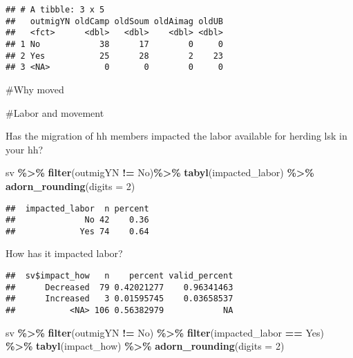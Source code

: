 \documentclass[
]{article}
\newenvironment{Shaded}{\begin{snugshade}}{\end{snugshade}}
\newcommand{\AttributeTok}[1]{\textcolor[rgb]{0.13,0.29,0.53}{#1}}
\newcommand{\DecValTok}[1]{\textcolor[rgb]{0.00,0.00,0.81}{#1}}
\newcommand{\FunctionTok}[1]{\textcolor[rgb]{0.13,0.29,0.53}{\textbf{#1}}}
\newcommand{\NormalTok}[1]{#1}
\newcommand{\SpecialCharTok}[1]{\textcolor[rgb]{0.81,0.36,0.00}{\textbf{#1}}}
\newcommand{\StringTok}[1]{\textcolor[rgb]{0.31,0.60,0.02}{#1}}
\begin{document}
\begin{verbatim}
## # A tibble: 3 x 5
##   outmigYN oldCamp oldSoum oldAimag oldUB
##   <fct>      <dbl>   <dbl>    <dbl> <dbl>
## 1 No            38      17        0     0
## 2 Yes           25      28        2    23
## 3 <NA>           0       0        0     0
\end{verbatim}

\#Why moved

\#Labor and movement

Has the migration of hh members impacted the labor available for herding
lsk in your hh?

\begin{Shaded}
\begin{Highlighting}[]
\NormalTok{sv }\SpecialCharTok{\%\textgreater{}\%} \FunctionTok{filter}\NormalTok{(outmigYN }\SpecialCharTok{!=} \StringTok{\textquotesingle{}No\textquotesingle{}}\NormalTok{)}\SpecialCharTok{\%\textgreater{}\%}
  \FunctionTok{tabyl}\NormalTok{(impacted\_labor) }\SpecialCharTok{\%\textgreater{}\%}
  \FunctionTok{adorn\_rounding}\NormalTok{(}\AttributeTok{digits =} \DecValTok{2}\NormalTok{) }
\end{Highlighting}
\end{Shaded}

\begin{verbatim}
##  impacted_labor  n percent
##              No 42    0.36
##             Yes 74    0.64
\end{verbatim}

How has it impacted labor?

\begin{Shaded}
\end{Shaded}

\begin{verbatim}
##  sv$impact_how   n    percent valid_percent
##      Decreased  79 0.42021277    0.96341463
##      Increased   3 0.01595745    0.03658537
##           <NA> 106 0.56382979            NA
\end{verbatim}

\begin{Shaded}
\begin{Highlighting}[]
\NormalTok{sv }\SpecialCharTok{\%\textgreater{}\%} \FunctionTok{filter}\NormalTok{(outmigYN }\SpecialCharTok{!=} \StringTok{\textquotesingle{}No\textquotesingle{}}\NormalTok{) }\SpecialCharTok{\%\textgreater{}\%}
  \FunctionTok{filter}\NormalTok{(impacted\_labor }\SpecialCharTok{==} \StringTok{\textquotesingle{}Yes\textquotesingle{}}\NormalTok{) }\SpecialCharTok{\%\textgreater{}\%}
  \FunctionTok{tabyl}\NormalTok{(impact\_how) }\SpecialCharTok{\%\textgreater{}\%}
  \FunctionTok{adorn\_rounding}\NormalTok{(}\AttributeTok{digits =} \DecValTok{2}\NormalTok{)}
\end{Highlighting}
\end{Shaded}
\end{document}
